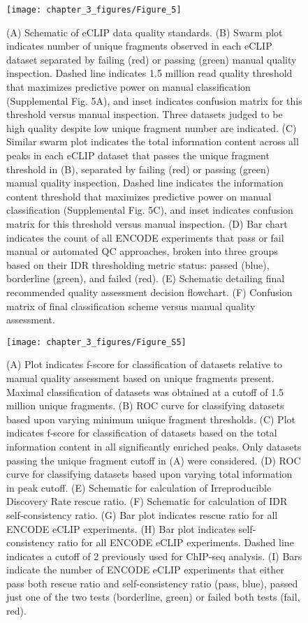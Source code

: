 \begin{figure}[ht]
  \centering
  \texttt{[image: chapter\_3\_figures/Figure\_5]}
  \caption[Figure 5. QC Guidelines for paired eCLIP experiments]{(A) Schematic of eCLIP data quality standards. (B) Swarm plot indicates number of unique fragments observed in each eCLIP dataset separated by failing (red) or passing (green) manual quality inspection. Dashed line indicates 1.5 million read quality threshold that maximizes predictive power on manual classification (Supplemental Fig. 5A), and inset indicates confusion matrix for this threshold versus manual inspection. Three datasets judged to be high quality despite low unique fragment number are indicated. (C) Similar swarm plot indicates the total information content across all peaks in each eCLIP dataset that passes the unique fragment threshold in (B), separated by failing (red) or passing (green) manual quality inspection. Dashed line indicates the information content threshold that maximizes predictive power on manual classification (Supplemental Fig. 5C), and inset indicates confusion matrix for this threshold versus manual inspection. (D) Bar chart indicates the count of all ENCODE experiments that pass or fail manual or automated QC approaches, broken into three groups based on their IDR thresholding metric status: passed (blue), borderline (green), and failed (red). (E) Schematic detailing final recommended quality assessment decision flowchart. (F) Confusion matrix of final classification scheme versus manual quality assessment.}
  \label{fig:Figure_5}
\end{figure}

\begin{figure}[ht]
  \centering
  \texttt{[image: chapter\_3\_figures/Figure\_S5]}
  \caption[Supplementary Figure 5. QC Guidelines for paired eCLIP experiments]{(A) Plot indicates f-score for classification of datasets relative to manual quality assessment based on unique fragments present. Maximal classification of datasets was obtained at a cutoff of 1.5 million unique fragments. (B) ROC curve for classifying datasets based upon varying minimum unique fragment thresholds. (C) Plot indicates f-score for classification of datasets based on the total information content in all significantly enriched peaks. Only datasets passing the unique fragment cutoff in (A) were considered. (D) ROC curve for classifying datasets based upon varying total information in peak cutoff. (E) Schematic for calculation of Irreproducible Discovery Rate rescue ratio. (F) Schematic for calculation of IDR self-consistency ratio. (G) Bar plot indicates rescue ratio for all ENCODE eCLIP experiments. (H) Bar plot indicates self-consistency ratio for all ENCODE eCLIP experiments. Dashed line indicates a cutoff of 2 previously used for ChIP-seq analysis. (I) Bars indicate the number of ENCODE eCLIP experiments that either pass both rescue ratio and self-consistency ratio (pass, blue), passed just one of the two tests (borderline, green) or failed both tests (fail, red).}
  \label{fig:Figure_S5}
\end{figure}

